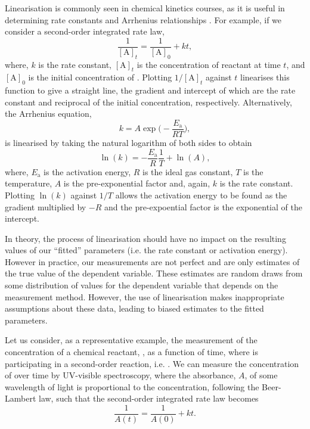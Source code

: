 \documentclass[reprint,superscriptaddress,nobibnotes,amsmath,amssymb]{revtex4-2}
\begin{document}
Linearisation is commonly seen in chemical kinetics courses, as it is useful in determining rate constants and Arrhenius relationships \cite{perrin_linear_2017,hites_calculating_2017}.
For example, if we consider a second-order integrated rate law,
%
\begin{equation}
    \frac{1}{[\mathrm{A}]_t} = \frac{1}{[\mathrm{A}]_0} + kt,
\end{equation}
%
where, $k$ is the rate constant, $[\mathrm{A}]_t$ is the concentration of reactant  at time $t$, and $[\mathrm{A}]_0$ is the initial concentration of . 
Plotting $1/[\mathrm{A}]_t$ against $t$ linearises this function to give a straight line, the gradient and intercept of which are the rate constant and reciprocal of the initial concentration, respectively. 
Alternatively, the Arrhenius equation, 
%
\begin{equation}
    k = A\exp{\bigg(-\frac{E_\mathrm{a}}{RT}\bigg)},
\end{equation}
%
is linearised by taking the natural logarithm of both sides to obtain
%
\begin{equation}
    \ln{(k)} = -\frac{E_{\mathrm{a}}}{R}\frac{1}{T} + \ln{(A)},
    \label{eqn:lin_arrhenius}
\end{equation}
%
where, $E_{\mathrm{a}}$ is the activation energy, $R$ is the ideal gas constant, $T$ is the temperature, $A$ is the pre-exponential factor and, again, $k$ is the rate constant.
Plotting $\ln{(k)}$ against $1/T$ allows the activation energy to be found as the gradient multiplied by $-R$ and the pre-expoential factor is the exponential of the intercept.

In theory, the process of linearisation should have no impact on the resulting values of our ``fitted'' parameters (i.e. the rate constant or activation energy). 
However in practice, our measurements are not perfect and are only estimates of the true value of the dependent variable.
These estimates are random draws from some distribution of values for the dependent variable that depends on the measurement method. 
However, the use of linearisation makes inappropriate assumptions about these data, leading to biased estimates to the fitted parameters. 

Let us consider, as a representative example, the measurement of the concentration of a chemical reactant, , as a function of time, where  is participating in a second-order reaction, i.e. . 
We can measure the concentration of  over time by UV-visible spectroscopy, where the absorbance, $A$, of some wavelength of light is proportional to the concentration, following the Beer-Lambert law, such that the second-order integrated rate law becomes
%
\begin{equation}
    \frac{1}{A(t)} = \frac{1}{A(0)} + kt.
\end{equation}
%
\end{document}
